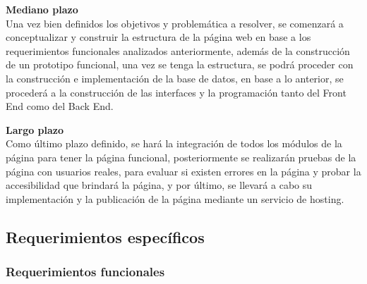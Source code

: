 \documentclass[12pt,letterpaper]{article}
\begin{document}
\vspace{0.3cm}
\noindent\textbf{Mediano plazo} \\
Una vez bien definidos los objetivos y problemática a resolver, se comenzará a conceptualizar y construir la estructura de la página web en base a los requerimientos funcionales analizados anteriormente, además de la construcción de un prototipo funcional, una vez se tenga la estructura, se podrá proceder con la construcción e implementación de la base de datos, en base a lo anterior, se procederá a la construcción de las interfaces y la programación tanto del Front End como del Back End.

\vspace{0.3cm}
\noindent\textbf{Largo plazo} \\
Como último plazo definido, se hará la integración de todos los módulos de la página para tener la página funcional, posteriormente se realizarán pruebas de la página con usuarios reales, para evaluar si existen errores en la página y probar la accesibilidad que brindará la página, y por último, se llevará a cabo su implementación y la publicación de la página mediante un servicio de hosting.

\newpage
\subsection{Requerimientos específicos}

\subsubsection{Requerimientos funcionales}
\end{document}
